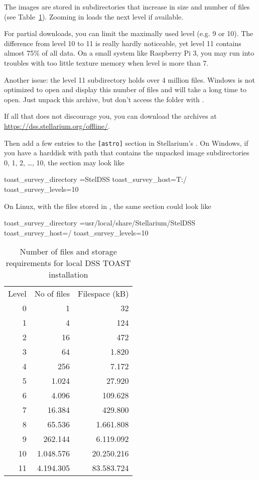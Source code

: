 The images are stored in subdirectories that increase in size and
number of files (see Table~\ref{tab:TOAST:levels}). Zooming in loads
the next level if available.

For partial downloads, you can limit the maximally used level (e.g. 9
or 10). The difference from level 10 to 11 is really hardly
noticeable, yet level 11 contains almost 75\% of all data. On a small
system like Raspberry Pi 3, you may run into troubles with too little
texture memory when level is more than 7.

Another issue: the level 11 subdirectory holds over 4 million
files. Windows  is not optimized to open and display
this number of files and will take a long time to open. Just unpack
this archive, but don't access the folder with .

If all that does not discourage you, you can download the archives at
\url{https://dss.stellarium.org/offline/}.

Then add a few entries to the \texttt{[astro]} section in
Stellarium's .  On Windows, if you have a harddisk
 with path  that contains the
unpacked image subdirectories 0, 1, 2, \ldots, 10, the section may look like
\begin{configfile}
[astro]
toast_survey_directory =StelDSS
toast_survey_host=T:/
toast_survey_levels=10
\end{configfile}
On Linux, with the files stored in , the same section could look like
\begin{configfile}
[astro]
toast_survey_directory =usr/local/share/Stellarium/StelDSS
toast_survey_host=/
toast_survey_levels=10
\end{configfile}

\begin{table}[htbp]
  \centering
\begin{tabular}{rrr}
Level & No of files & Filespace (kB)\\
0     &          1  &         32\\
1     &          4  &        124\\
2     &         16  &        472\\
3     &         64  &      1.820\\
4     &        256  &      7.172\\
5     &      1.024  &     27.920\\
6     &      4.096  &    109.628\\
7     &     16.384  &    429.800\\
8     &     65.536  &  1.661.808\\
9     &    262.144  &  6.119.092\\
10    &  1.048.576  & 20.250.216\\
11    &  4.194.305  & 83.583.724
\end{tabular}
\caption{Number of files and storage requirements for local DSS TOAST installation}
\label{tab:TOAST:levels}
\end{table}




